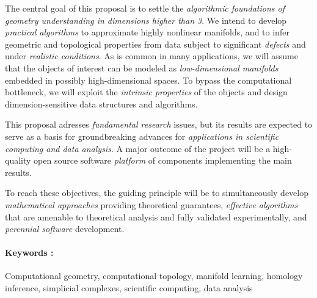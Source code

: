 \documentclass[a4paper, 11pt]{article}
\begin{document}
The central goal of this proposal is to settle the {\em algorithmic
foundations of geometry understanding in 
dimensions higher than 3}.  We intend to develop {\em practical algorithms} to approximate
highly nonlinear manifolds, and to infer geometric and topological
properties from data subject to significant {\em defects} and under
{\em realistic conditions}. 
%
As is common in many applications, we will assume that  the objects of
interest can be modeled as {\em low-dimensional manifolds} 
embedded in possibly high-dimensional spaces.
To  bypass the computational bottleneck, we will 
exploit the {\em intrinsic properties} of the objects and design
dimension-sensitive data structures and algorithms.%

This proposal adresses {\em fundamental
  research} issues, but its results are expected to serve as a basis
for groundbreaking advances for {\em applications in scientific computing
and data analysis}.  A major outcome of the project will be a
high-quality open source software {\em platform} of components
implementing the main results.

To reach these objectives, the guiding principle  will be to simultaneously
develop {\em mathematical approaches} providing theoretical
guarantees, {\em effective algorithms} that are amenable to
theoretical analysis and fully validated experimentally, and {\em
  perennial software} development. 




\paragraph{Keywords :} Computational geometry, computational topology,
manifold learning, homology inference, simplicial complexes,
scientific computing, data analysis
\newpage
\end{document}
